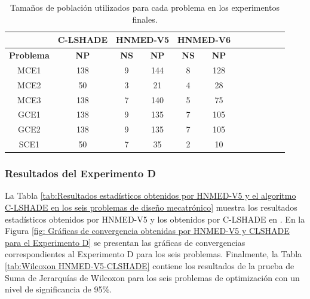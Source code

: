 \begin{table}[]
	\centering
	\caption{Tamaños de población utilizados para cada problema en los experimentos finales.}
	\label{tab:Tamaños de población utilizados para cada problema en los experimentos finales}
	
	\begin{tabular}{cccccccccccc}
		& \textbf{C-LSHADE } & \multicolumn{2}{l}{\textbf{HNMED-V5}}&\multicolumn{2}{l}{\textbf{HNMED-V6}}\\
		\hline
		\textbf{Problema} & \textbf{NP}    & \textbf{NS} & \textbf{NP}& \textbf{NS}& \textbf{NP}\\
		\hline
		MCE1     & 138           & 9           & 144 &8&128   \\
		MCE2     & 50            & 3           & 21  &4&28       \\
		MCE3     & 138           & 7           & 140 &5&75      \\
		GCE1     & 138           & 9           & 135 &7&105        \\
		GCE2     & 138           & 9           & 135 &7&105    \\
		SCE1     & 50            & 7           & 35  &2&10       
	\end{tabular}
	
\end{table}


\subsubsection{Resultados del Experimento D}
La Tabla \ref{tab:Resultados estadísticos obtenidos por HNMED-V5 y el algoritmo C-LSHADE en los seis problemas de diseño mecatrónico} muestra los resultados estadísticos obtenidos por HNMED-V5 y los obtenidos por C-LSHADE en \cite{zapata_zapata_control_2017}. En la Figura \ref{fig: Gráficas de convergencia obtenidas por HNMED-V5 y CLSHADE para el Experimento D} se presentan las gráficas de convergencias correspondientes al Experimento D para los seis problemas. Finalmente, la Tabla \ref{tab:Wilcoxon HNMED-V5-CLSHADE} contiene los resultados de la prueba de Suma de Jerarquías de Wilcoxon para los seis problemas de optimización con un nivel de significancia de 95\%.

